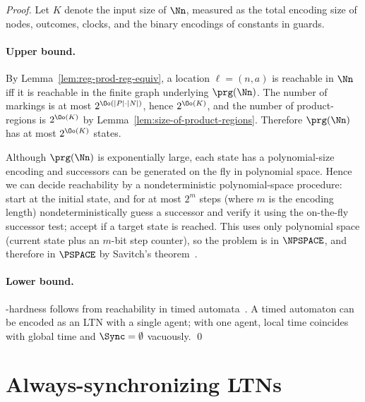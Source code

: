 \begin{proof}
Let $K$ denote the input size of $\Nn$, measured as the total encoding size of
nodes, outcomes, clocks, and the binary encodings of constants in guards.

\paragraph{Upper bound.}
By Lemma~\ref{lem:reg-prod-reg-equiv}, a location $\ell=(n,a)$ is reachable in
$\Nn$ iff it is reachable in the finite graph underlying $\prg(\Nn)$.
The number of markings is at most $2^{\Oo(|P|\cdot |N|)}$, hence
$2^{\Oo(K)}$, and the number of product-regions is $2^{\Oo(K)}$ by
Lemma~\ref{lem:size-of-product-regions}. Therefore $\prg(\Nn)$ has at most
$2^{\Oo(K)}$ states.


Although $\prg(\Nn)$ is exponentially large, each state has a polynomial-size
encoding and successors can be generated on the fly in polynomial space. Hence
we can decide reachability by a nondeterministic polynomial-space procedure:
start at the initial state, and for at most $2^m$ steps (where $m$ is the
encoding length) nondeterministically guess a successor and verify it using the
on-the-fly successor test; accept if a target state is reached. This uses only
polynomial space (current state plus an $m$-bit step counter), so the problem is
in $\NPSPACE$, and therefore in $\PSPACE$ by Savitch's theorem~\cite{SAVITCH1970177}.

\paragraph{Lower bound.}
\PSPACE-hardness follows from reachability in timed automata~\cite{DBLP:journals/tcs/AlurD94}.
A timed automaton can be encoded as an LTN with a single agent; with one agent,
local time coincides with global time and $\Sync=\emptyset$ vacuously. \qed
\end{proof}

\section{Always-synchronizing LTNs}
\label{sec:always-synchr-negot}

